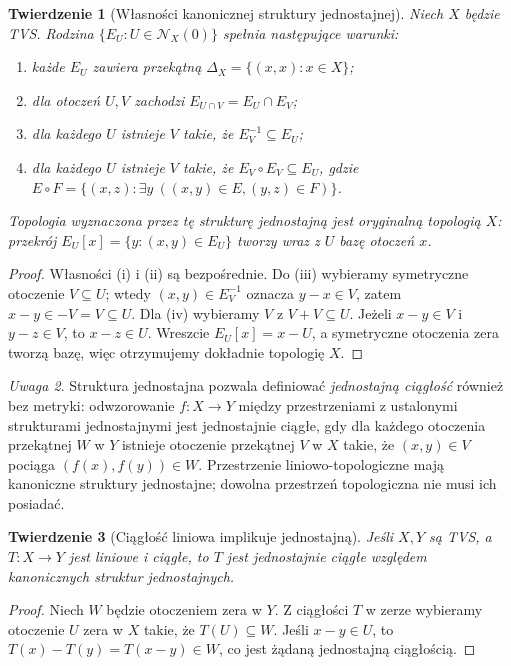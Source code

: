 \documentclass[11pt,a4paper]{article}
\numberwithin{equation}{section}
\theoremstyle{plain}
\newtheorem{twierdzenie}{Twierdzenie}[section]
\theoremstyle{definition}
\theoremstyle{remark}
\newtheorem{uwaga}[twierdzenie]{Uwaga}
\begin{document}
\begin{twierdzenie}[Własności kanonicznej struktury jednostajnej]
\label{thm:uniform-tvs}
Niech $X$ będzie TVS. Rodzina $\{E_U:U\in\mathcal N_X(0)\}$
spełnia następujące warunki:
\begin{enumerate}[label=\textup{(\roman*)}]
\item każde $E_U$ zawiera przekątną $\Delta_X=\{(x,x):x\in X\}$;
\item dla otoczeń $U,V$ zachodzi $E_{U\cap V}=E_U\cap E_V$;
\item dla każdego $U$ istnieje $V$ takie, że $E_V^{-1}\subseteq E_U$;
\item dla każdego $U$ istnieje $V$ takie, że
      $E_V\circ E_V\subseteq E_U$, gdzie
      $E\circ F=\{(x,z):\exists y\ ((x,y)\in E,(y,z)\in F)\}$.
\end{enumerate}
Topologia wyznaczona przez tę strukturę jednostajną jest oryginalną
topologią $X$: przekrój $E_U[x]=\{y:(x,y)\in E_U\}$
tworzy wraz z $U$ bazę otoczeń $x$.
\end{twierdzenie}
\begin{proof}
Własności (i) i (ii) są bezpośrednie. Do (iii) wybieramy symetryczne
otoczenie $V\subseteq U$; wtedy $(x,y)\in E_V^{-1}$ oznacza
$y-x\in V$, zatem $x-y\in-V=V\subseteq U$.
Dla (iv) wybieramy $V$ z $V+V\subseteq U$. Jeżeli
$x-y\in V$ i $y-z\in V$, to $x-z\in U$.
Wreszcie $E_U[x]=x-U$, a symetryczne otoczenia zera tworzą bazę,
więc otrzymujemy dokładnie topologię $X$.
\end{proof}

\begin{uwaga}
Struktura jednostajna pozwala definiować \emph{jednostajną
ciągłość} również bez metryki: odwzorowanie $f:X\to Y$
między przestrzeniami z ustalonymi strukturami jednostajnymi
jest jednostajnie ciągłe, gdy dla każdego otoczenia przekątnej
$W$ w $Y$ istnieje otoczenie przekątnej $V$ w $X$ takie,
że $(x,y)\in V$ pociąga $(f(x),f(y))\in W$.
Przestrzenie liniowo-topologiczne mają kanoniczne struktury
jednostajne; dowolna przestrzeń topologiczna nie musi ich posiadać.
\end{uwaga}

\begin{twierdzenie}[Ciągłość liniowa implikuje jednostajną]
\label{thm:linear-uniform}
Jeśli $X,Y$ są TVS, a $T:X\to Y$ jest liniowe i ciągłe,
to $T$ jest jednostajnie ciągłe względem kanonicznych
struktur jednostajnych.
\end{twierdzenie}
\begin{proof}
Niech $W$ będzie otoczeniem zera w $Y$. Z ciągłości $T$ w zerze
wybieramy otoczenie $U$ zera w $X$ takie, że $T(U)\subseteq W$.
Jeśli $x-y\in U$, to $T(x)-T(y)=T(x-y)\in W$, co jest
żądaną jednostajną ciągłością.
\end{proof}
\end{document}
